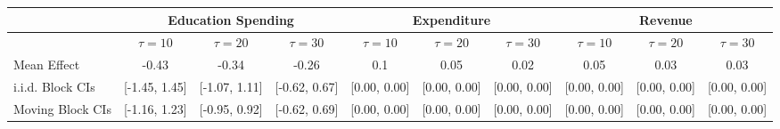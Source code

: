 \begin{tabular}{@{}lccccccccc@{}}
		\toprule
		 & \multicolumn{3}{c}{Education Spending}        & \multicolumn{3}{c}{Expenditure}            & \multicolumn{3}{c}{Revenue}                \\ \midrule
		& $\tau = 10$   & $\tau = 20$   & $\tau = 30$   & $\tau = 10$  & $\tau = 20$  & $\tau = 30$  & $\tau = 10$  & $\tau = 20$  & $\tau = 30$  \\
		\hline
		Mean Effect                          & -0.43         & -0.34         & -0.26         & 0.1          & 0.05         & 0.02         & 0.05         & 0.03         & 0.03         \\
		i.i.d. Block CIs                       & [-1.45, 1.45] & [-1.07, 1.11] & [-0.62, 0.67] & [0.00, 0.00] & [0.00, 0.00] & [0.00, 0.00] & [0.00, 0.00] & [0.00, 0.00] & [0.00, 0.00] \\
		Moving Block CIs                       & [-1.16, 1.23] & [-0.95, 0.92] & [-0.62, 0.69] & [0.00, 0.00] & [0.00, 0.00] & [0.00, 0.00] & [0.00, 0.00] & [0.00, 0.00] & [0.00, 0.00] \\ \bottomrule
\end{tabular}
